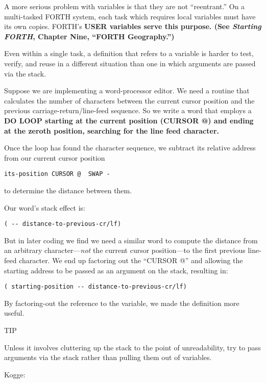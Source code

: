 A more serious problem with variables is that they are not ``reentrant.''
On a multi-tasked FORTH system, each task which requires
local variables must have its own copies. FORTH's \bf{USER} variables
serve this purpose. (See \emph{Starting FORTH}, Chapter Nine, ``FORTH
Geography.'')

Even within a single task, a definition that refers to a variable is
harder to test, verify, and reuse in a different situation than one in which
arguments are passed via the stack.

Suppose we are implementing a word-processor editor. We need a
routine that calculates the number of characters between the current cursor
position and the previous carriage-return/line-feed sequence. So we
write a word that employs a \bf{DO LOOP} starting at the current position
(CURSOR @) and ending at the zeroth position, searching for the line
feed character.

Once the loop has found the character sequence, we subtract its
relative address from our current cursor position

\begin{verbatim}
its-position CURSOR @  SWAP -
\end{verbatim}

to determine the distance between them.

Our word's stack effect is:

\begin{verbatim}
( -- distance-to-previous-cr/lf)
\end{verbatim}

But in later coding we find we need a similar word to compute the
distance from an arbitrary character---\emph{not} the current cursor
position---to the first previous line-feed character. We end up factoring
out the ``CURSOR @'' and allowing the starting address to be passed as an
argument on the stack, resulting in:

\begin{verbatim}
( starting-position -- distance-to-previous-cr/lf)
\end{verbatim}

By factoring-out the reference to the variable, we made the definition
more useful.

TIP

Unless it involves cluttering up the stack to the point of unreadability, try
to pass arguments via the stack rather than pulling them out of variables.

Kogge:

